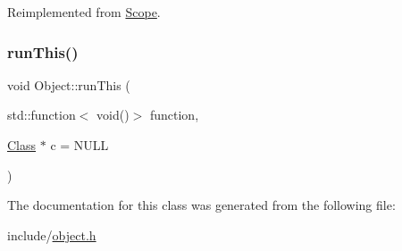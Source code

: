 Reimplemented from \hyperlink{classScope_a4c2622adf1835753f5233869febd80d4}{Scope}.

\mbox{\label{classObject_ae2bc4dcbc6eba10f4a93e0939477b7d5}} 
\subsubsection{\texorpdfstring{run\+This()}{runThis()}}
{\footnotesize\ttfamily void Object\+::run\+This (\begin{DoxyParamCaption}\item[{std\+::function$<$ void()$>$}]{function,  }\item[{\hyperlink{classClass}{Class} $\ast$}]{c = {\ttfamily NULL} }\end{DoxyParamCaption})}



The documentation for this class was generated from the following file\+:\begin{DoxyCompactItemize}
\item 
include/\hyperlink{object_8h}{object.\+h}\end{DoxyCompactItemize}
